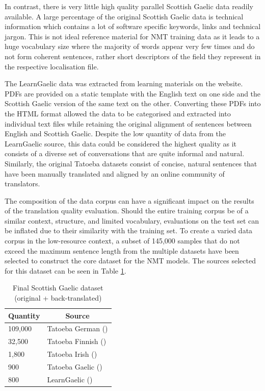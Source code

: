 In contrast, there is very little high quality parallel Scottish Gaelic data readily available. A large percentage of the original Scottish Gaelic data is technical information which contains a lot of software specific keywords, links and technical jargon. This is not ideal reference material for \acrshort{NMT} training data as it leads to a huge vocabulary size where the majority of words appear very few times and do not form coherent sentences, rather short descriptors of the field they represent in the respective localisation file. 

The LearnGaelic data was extracted from learning materials on the \cite{learn_gaelic_2019} website. PDFs are provided on a static template with the English text on one side and the Scottish Gaelic version of the same text on the other. Converting these PDFs into the HTML format allowed the data to be categorised and extracted into individual text files while retaining the original alignment of sentences between English and Scottish Gaelic.
Despite the low quantity of data from the LearnGaelic source, this data could be considered the highest quality as it consists of a diverse set of conversations that are quite informal and natural. Similarly, the original Tatoeba datasets consist of concise, natural sentences that have been manually translated and aligned by an online community of translators.

The composition of the data corpus can have a significant impact on the results of the translation quality evaluation. Should the entire training corpus be of a similar context, structure, and limited vocabulary, evaluations on the test set can be inflated due to their similarity with the training set.
To create a varied data corpus in the low-resource context, a subset of 145,000 samples that do not exceed the maximum sentence length from the multiple datasets have been selected to construct the core dataset for the \acrshort{NMT} models. The sources selected for this dataset can be seen in Table \ref{tab:low_resource-data}.

\begin{table}[!ht]
\centering
\begin{tabular}{|l|l|}
\hline
\multicolumn{1}{|c|}{\textbf{Quantity}} & \multicolumn{1}{|c|}{\textbf{Source}} \\ \hline
109,000  & Tatoeba German (\cite{tatoeba_data_2020}) \\ \hline %
32,500  & Tatoeba Finnish (\cite{tatoeba_data_2020}) \\ \hline %
1,800   & Tatoeba Irish (\cite{tatoeba_data_2020}) \\ \hline
900     & Tatoeba Gaelic (\cite{tatoeba_data_2020}) \\ \hline
800     & LearnGaelic (\cite{learn_gaelic_2019}) \\ \hline
\end{tabular}
\captionsetup{justification=centering}
\caption{Final Scottish Gaelic dataset (original + back-translated)}
\label{tab:low_resource-data}
\end{table}

